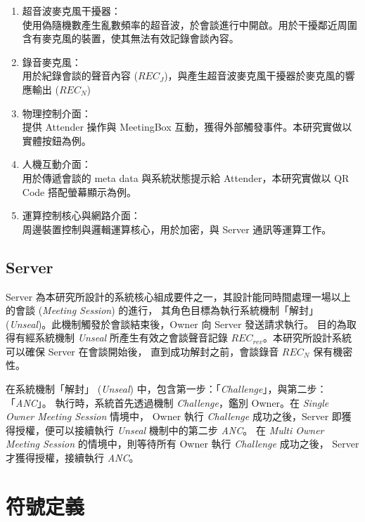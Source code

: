     \begin{enumerate}
        \item 超音波麥克風干擾器：\\
            使用偽隨機數產生亂數頻率的超音波，於會談進行中開啟。用於干擾鄰近周圍含有麥克風的裝置，使其無法有效記錄會談內容。

        \item 錄音麥克風：\\
            用於紀錄會談的聲音內容 ($REC_{J}$)，與產生超音波麥克風干擾器於麥克風的響應輸出 ($REC_{N}$)

        \item 物理控制介面：\\
            提供 Attender 操作與 MeetingBox 互動，獲得外部觸發事件。本研究實做以實體按鈕為例。

        \item 人機互動介面：\\
            用於傳遞會談的 meta data 與系統狀態提示給 Attender，本研究實做以 QR Code 搭配螢幕顯示為例。

        \item 運算控制核心與網路介面：\\
            周邊裝置控制與邏輯運算核心，用於加密，與 Server 通訊等運算工作。
    \end{enumerate}


\subsection{Server}

    Server 為本研究所設計的系統核心組成要件之一，其設計能同時間處理一場以上的會談 ({\it Meeting Session}) 的進行，
其角色目標為執行系統機制「解封」 ({\it Unseal})。此機制觸發於會談結束後，Owner 向 Server 發送請求執行。
目的為取得有經系統機制 {\it Unseal} 所產生有效之會談聲音記錄 $REC_{rev}$。本研究所設計系統可以確保 Server 在會談開始後，
直到成功解封之前，會談錄音 $REC_{N}$ 保有機密性。

    在系統機制「解封」 ({\it Unseal}) 中，包含第一步：「{\it Challenge}」，與第二步：「{\it ANC}」。
執行時，系統首先透過機制 {\it Challenge}，鑑別 Owner。在 {\it Single Owner Meeting Session} 情境中，
Owner 執行 {\it Challenge} 成功之後，Server 即獲得授權，便可以接續執行 {\it Unseal} 機制中的第二步 {\it ANC}。
在 {\it Multi Owner Meeting Session} 的情境中，則等待所有 Owner 執行 {\it Challenge} 成功之後，
Server 才獲得授權，接續執行 {\it ANC}。


\section{符號定義}

